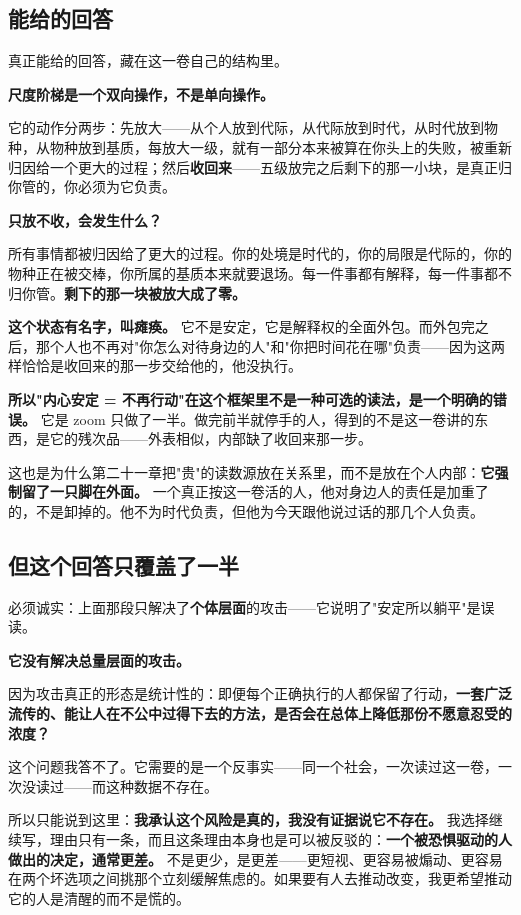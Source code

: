 \documentclass[11pt,a4paper]{ctexart}
\begin{document}
\subsection{能给的回答}

真正能给的回答，藏在这一卷自己的结构里。

\textbf{尺度阶梯是一个双向操作，不是单向操作。}

它的动作分两步：先放大——从个人放到代际，从代际放到时代，从时代放到物种，从物种放到基质，每放大一级，就有一部分本来被算在你头上的失败，被重新归因给一个更大的过程；然后\textbf{收回来}——五级放完之后剩下的那一小块，是真正归你管的，你必须为它负责。

\textbf{只放不收，会发生什么？}

所有事情都被归因给了更大的过程。你的处境是时代的，你的局限是代际的，你的物种正在被交棒，你所属的基质本来就要退场。每一件事都有解释，每一件事都不归你管。\textbf{剩下的那一块被放大成了零。}

\textbf{这个状态有名字，叫瘫痪。} 它不是安定，它是解释权的全面外包。而外包完之后，那个人也不再对"你怎么对待身边的人"和"你把时间花在哪"负责——因为这两样恰恰是收回来的那一步交给他的，他没执行。

\textbf{所以"内心安定 = 不再行动"在这个框架里不是一种可选的读法，是一个明确的错误。} 它是 zoom 只做了一半。做完前半就停手的人，得到的不是这一卷讲的东西，是它的残次品——外表相似，内部缺了收回来那一步。

这也是为什么第二十一章把"贵"的读数源放在关系里，而不是放在个人内部：\textbf{它强制留了一只脚在外面。} 一个真正按这一卷活的人，他对身边人的责任是加重了的，不是卸掉的。他不为时代负责，但他为今天跟他说过话的那几个人负责。

\subsection{但这个回答只覆盖了一半}

必须诚实：上面那段只解决了\textbf{个体层面}的攻击——它说明了"安定所以躺平"是误读。

\textbf{它没有解决总量层面的攻击。}

因为攻击真正的形态是统计性的：即便每个正确执行的人都保留了行动，\textbf{一套广泛流传的、能让人在不公中过得下去的方法，是否会在总体上降低那份不愿意忍受的浓度？}

这个问题我答不了。它需要的是一个反事实——同一个社会，一次读过这一卷，一次没读过——而这种数据不存在。

所以只能说到这里：\textbf{我承认这个风险是真的，我没有证据说它不存在。} 我选择继续写，理由只有一条，而且这条理由本身也是可以被反驳的：\textbf{一个被恐惧驱动的人做出的决定，通常更差。} 不是更少，是更差——更短视、更容易被煽动、更容易在两个坏选项之间挑那个立刻缓解焦虑的。如果要有人去推动改变，我更希望推动它的人是清醒的而不是慌的。
\end{document}

